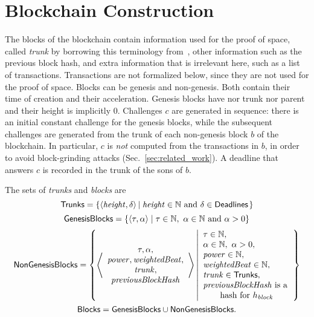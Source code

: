 \section{Blockchain Construction}\label{sec:blockchain_construction}

The blocks of the blockchain contain information used for the proof
of space, called \emph{trunk} by borrowing this terminology from~\cite{CohenP19},
other information such as the previous block hash,
and extra information that is irrelevant here, such as a list of transactions.
Transactions are not formalized below, since they are not used for the proof of space.
Blocks can be genesis and non-genesis. Both contain their time of creation and their acceleration.
Genesis blocks have nor trunk nor parent and their height is implicitly $0$.
Challenges $c$ are generated in sequence: there is an initial constant challenge for the genesis
blocks, while the subsequent challenges are generated from the trunk of
each non-genesis block $b$ of the blockchain.
In particular, $c$ is \emph{not} computed from the transactions in $b$,
in order to avoid block-grinding attacks (Sec.~\ref{sec:related_work}).
A deadline that answers $c$ is recorded in the trunk of the sons of $b$.
%
\begin{definition}\label{def:trunk}
  The sets of \emph{trunks} and \emph{blocks} are
  \[
  {\mathsf{Trunks}}=\left\{\langle{\mathit{height}},\delta\rangle\left|\;{\mathit{height}}\in\mathbb{N}\text{ and }\delta\in{\mathsf{Deadlines}}\right.\right\}
  \]
  \[
  \GenesisBlocks=\left\{\langle\tau,\alpha\rangle\mid\tau\in\mathbb{N},\ \alpha\in\mathbb{N}\text{ and }\alpha>0\right\}
  \]
  \[
  {\mathsf{NonGenesisBlocks}}=\left\{\left\langle\begin{array}{c}
  \tau,\alpha,\\
  {\mathit{power}},\mathit{weightedBeat},\\
  {\mathit{trunk}},\\
  {\mathit{previousBlockHash}}
  \end{array}\right\rangle\left|\begin{array}{l}
  \tau\in\mathbb{N},\\
  \alpha\in\mathbb{N},\ \alpha>0,\\
  {\mathit{power}}\in\mathbb{N},\\
  \mathit{weightedBeat}\in\mathbb{N},\\
  {\mathit{trunk}}\in{\mathsf{Trunks}},\\
  {\mathit{previousBlockHash}}\text{ is a}\\
  \qquad\text{hash for $h_{\mathit{block}}$}
  \end{array}\right.\right\}
  \]
  \[
  {\mathsf{Blocks}}={\mathsf{GenesisBlocks}}\cup{\mathsf{NonGenesisBlocks}}.
  \]
\end{definition}
